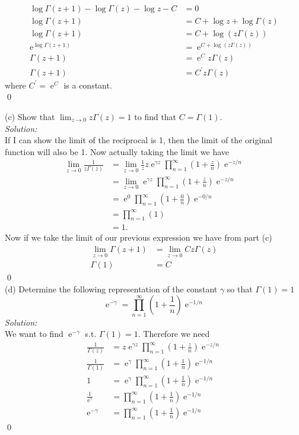 \documentclass[10pt]{amsart}
\DeclareMathOperator{\E}{e}
\theoremstyle{nonumberplain}
\begin{document}
\begin{enumerate}[label={\bf {\arabic*}:}]
\begin{align*}
\log \Gamma(z + 1) - \log {\Gamma(z)} - \log z - C &= 0 \\
\log \Gamma(z + 1) &= C + \log z + \log {\Gamma(z)} \\
\log \Gamma(z + 1) &= C + \log (z{\Gamma(z)}) \\
\E^{\log \Gamma(z + 1)} &= \E^{C + \log (z{\Gamma(z)})} \\
\Gamma(z + 1) &= \E^C z\Gamma(z) \\
\Gamma(z + 1) &= C^\prime z\Gamma(z)
\end{align*}
where $C^\prime = \E^C$ is a constant. \\
\qed \\
\newpage

\noindent
(c) Show that $\lim_{z\rightarrow 0} z \Gamma(z) = 1$ to find that $C = \Gamma(1)$. \\

\noindent
\textit{Solution:} \\
If I can show the limit of the reciprocal is 1, then the limit of the original function will also be 1.
Now actually taking the limit we have
\begin{align*}
\lim_{z\rightarrow 0} \frac 1 {z \Gamma(z)}
	&= \lim_{z\rightarrow 0} \frac 1 z z \E^{\gamma z} \prod_{n=1}^\infty \left( 1 + \frac z n \right) \E^{-z / n} \\
	&= \lim_{z\rightarrow 0} \E^{\gamma z} \prod_{n=1}^\infty \left( 1 + \frac z n \right) \E^{-z / n} \\
	&= \E^{0} \prod_{n=1}^\infty \left( 1 + \frac 0 n \right) \E^{-0 / n} \\
	&= \prod_{n=1}^\infty \left( 1\right) \\
	&= 1.
\end{align*}
Now if we take the limit of our previous expression we have from part (c)
\begin{align*}
\lim_{z \rightarrow 0} \Gamma(z + 1) &= \lim_{z \rightarrow 0} Cz\Gamma(z) \\
\Gamma(1) &= C
\end{align*}
\qed \\

\noindent
(d) Determine the following representation of the constant $\gamma$ so that $\Gamma(1) = 1$
$$
\E^{-\gamma} = \prod_{n = 1}^\infty \left(1 + \frac 1 n\right)\E^{-1/n}
$$
\textit{Solution:} \\
We want to find $\E^{-\gamma}$ s.t. $\Gamma(1) = 1$.
Therefore we need
\begin{align*}
\frac 1 {\Gamma(z)} &= z \E^{\gamma z} \prod_{n=1}^\infty \left( 1 + \frac z n \right) \E^{-z / n} \\
\frac 1 {\Gamma(1)} &= \E^\gamma \prod_{n=1}^\infty \left( 1 + \frac 1 n \right) \E^{-1 / n} \\
1 &= \E^\gamma \prod_{n=1}^\infty \left( 1 + \frac 1 n \right) \E^{-1 / n} \\
\frac 1 {\E^\gamma} &= \prod_{n=1}^\infty \left( 1 + \frac 1 n \right) \E^{-1 / n} \\
\E^{-\gamma} &= \prod_{n=1}^\infty \left( 1 + \frac 1 n \right) \E^{-1 / n}
\end{align*}
\qed \\
\newpage


\end{enumerate}
\end{document}
